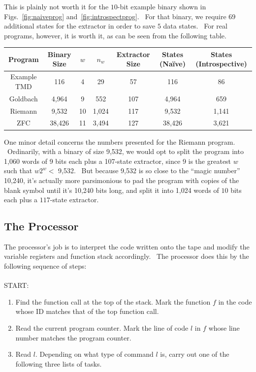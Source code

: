 \documentclass[11pt]{article}
\begin{document}
This is plainly not worth it for the $10$-bit example binary shown in Figs.~\ref{fig:naiveprog} and~\ref{fig:introspectprog}. \ For that binary, we require $69$ additional states for the extractor in order to save $5$ data states. \ For real programs, however, it is worth it, as can be seen from the following table.

\begin{center}
    \begin{tabular}{||c c c c c c c||}
    \hline
    Program & Binary Size & $w$ & $n_w$ & Extractor Size & States (Na\"ive) & States (Introspective) \\ [0.5ex]
    \hline\hline
    Example TMD & 116 & 4 & 29 & 57 & 116 & 86 \\
    \hline
    Goldbach & 4,964 & 9 & 552 & 107 & 4,964 & 659 \\
    \hline
    Riemann & 9,532 & 10 & 1,024 & 117 & 9,532 & 1,141 \\
    \hline
    ZFC & 38,426 & 11 & 3,494 & 127 & 38,426 & 3,621 \\
    \hline
    \end{tabular}
\end{center}

One minor detail concerns the numbers presented for the Riemann program. \ Ordinarily, with a binary of size 9,532, we would opt to split the program into 1,060 words of 9 bits each plus a 107-state extractor, since 9 is the greatest $w$ such that $w2^w <$ 9,532. \ But because 9,532 is so close to the ``magic number'' 10,240, it's actually more parsimonious to pad the program with copies of the blank symbol until it's 10,240 bits long, and split it into 1,024 words of $10$ bits each plus a $117$-state extractor.


\subsection{The Processor}

The processor's job is to interpret the code written onto the tape and modify the variable registers and function stack accordingly. \ The processor does this by the following sequence of steps:  \\ \\
START:
\begin{enumerate}
\item Find the function call at the top of the stack. Mark the function $f$ in the code whose ID matches that of the top function call.
\item Read the current program counter. Mark the line of code $l$ in $f$ whose line number matches the program counter.
\item Read $l$. Depending on what type of command $l$ is, carry out one of the following three lists of tasks.
\end{enumerate}
\end{document}
